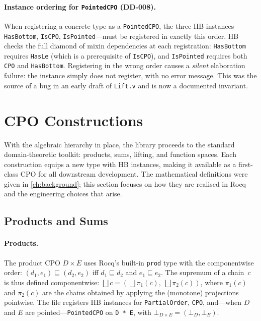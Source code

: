\paragraph{Instance ordering for \texttt{PointedCPO} (DD-008).}
When registering a concrete type as a \texttt{PointedCPO}, the three HB
instances---\texttt{HasBottom}, \texttt{IsCPO}, \texttt{IsPointed}---must
be registered in exactly this order.  HB checks the full diamond of mixin
dependencies at each registration: \texttt{HasBottom} requires
\texttt{HasLe} (which is a prerequisite of \texttt{IsCPO}), and
\texttt{IsPointed} requires both \texttt{CPO} and \texttt{HasBottom}.
Registering in the wrong order causes a \emph{silent} elaboration failure:
the instance simply does not register, with no error message.  This was
the source of a bug in an early draft of \texttt{Lift.v} and is now a
documented invariant.

\section{CPO Constructions}
\label{sec:meth-constructions}

With the algebraic hierarchy in place, the library proceeds to the
standard domain-theoretic toolkit: products, sums, lifting, and function
spaces.  Each construction equips a new type with HB instances, making
it available as a first-class CPO for all downstream development.  The
mathematical definitions were given in \cref{ch:background}; this
section focuses on how they are realised in Rocq and the engineering
choices that arise.


\subsection{Products and Sums}
\label{sec:meth-products-sums}


\paragraph{Products.}
The product CPO $D \times E$ uses Rocq's built-in \texttt{prod} type
with the componentwise order:
$(d_1, e_1) \sqsubseteq (d_2, e_2)$ iff
$d_1 \sqsubseteq d_2$ and $e_1 \sqsubseteq e_2$.
The supremum of a chain~$c$ is thus defined componentwise:
$\bigsqcup c = (\bigsqcup \pi_1(c),\; \bigsqcup \pi_2(c))$,
where $\pi_1(c)$ and $\pi_2(c)$ are the chains obtained by applying
the (monotone) projections pointwise.  The file registers HB instances
for \texttt{PartialOrder}, \texttt{CPO}, and---when $D$ and $E$ are
pointed---\texttt{PointedCPO} on \texttt{D~*~E}, with
$\bot_{D \times E} = (\bot_D, \bot_E)$.

